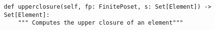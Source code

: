 \begin{verbatim}
def upperclosure(self, fp: FinitePoset, s: Set[Element]) -> Set[Element]:
    """ Computes the upper closure of an element"""
\end{verbatim}